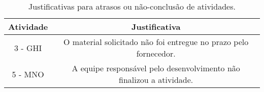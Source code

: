 \begin{landscape}
\begin{table}[htpb]
\begin{center}
\caption{Justificativas para atrasos ou não-conclusão de atividades.}
\begin{tabular}{|c|c|} \hline
\textbf{Atividade} & \textbf{Justificativa}  \\ \hline 
    3 - GHI &
    O material solicitado não foi entregue no prazo pelo fornecedor. \\ \hline
    5 - MNO &
    A equipe responsável pelo desenvolvimento não finalizou a atividade. \\ \hline
\end{tabular}
\end{center}
\end{table}









\end{landscape}
